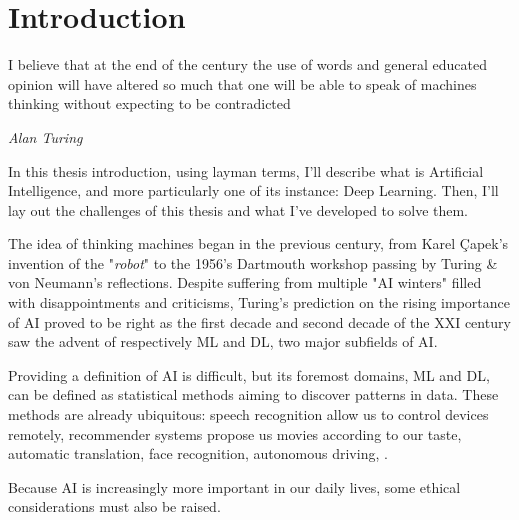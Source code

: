 \chapter{Introduction}
\label{chapter:introduction}

{}





\epigraph{I believe that at the end of the century the use of words and general educated opinion
      will have altered so much that one will be able to speak of machines thinking without expecting to
      be contradicted}{\textit{Alan Turing}}

In this thesis introduction, using layman terms, I'll describe what is Artificial Intelligence, and
more particularly one of its instance: Deep Learning. Then, I'll lay out the challenges of this
thesis and what I've developed to solve them.


The idea of thinking machines began in the previous century, from Karel Çapek's invention of the
"\textit{robot}" to the 1956's Dartmouth workshop passing by Turing \& von Neumann's reflections.
Despite suffering from multiple "AI winters" filled with disappointments and criticisms, Turing's
prediction on the rising importance of \ac{AI} proved to be right as the first decade and second
decade of the XXI century saw the advent of respectively \acf{ML} and \acf{DL}, two major subfields
of \ac{AI}.

Providing a definition of \ac{AI} is difficult, but its foremost domains, \ac{ML} and \ac{DL}, can be
defined as statistical methods aiming to discover patterns in data. These methods are already
ubiquitous: speech recognition allow us to control devices remotely, recommender
systems propose us movies according to our taste, automatic translation, face recognition,
autonomous driving, \etc.

Because \ac{AI} is increasingly more important in our daily lives, some ethical considerations must
also be raised. 

